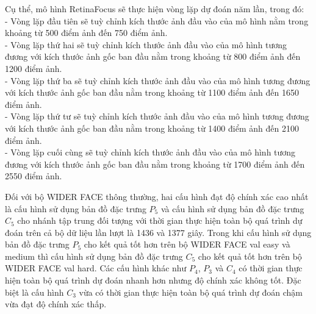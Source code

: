 {    \noindent
    Cụ thể, mô hình RetinaFocus sẽ thực hiện vòng lặp dự đoán năm lần, trong đó: \\
    - Vòng lặp đầu tiên sẽ tuỳ chỉnh kích thước ảnh đầu vào của mô hình nằm trong khoảng từ 500 điểm ảnh đến 750 điểm ảnh. \\
    - Vòng lặp thứ hai sẽ tuỳ chỉnh kích thước ảnh đầu vào của mô hình tương đương với kích thước ảnh gốc ban đầu nằm trong khoảng từ 800 điểm ảnh đến 1200 điểm ảnh. \\
    - Vòng lặp thứ ba sẽ tuỳ chỉnh kích thước ảnh đầu vào của mô hình tương đương với kích thước ảnh gốc ban đầu nằm trong khoảng từ 1100 điểm ảnh đến 1650 điểm ảnh. \\
    - Vòng lặp thứ tư sẽ tuỳ chỉnh kích thước ảnh đầu vào của mô hình tương đương với kích thước ảnh gốc ban đầu nằm trong khoảng từ 1400 điểm ảnh đến 2100 điểm ảnh. \\
    - Vòng lặp cuối cùng sẽ tuỳ chỉnh kích thước ảnh đầu vào của mô hình tương đương với kích thước ảnh gốc ban đầu nằm trong khoảng từ 1700 điểm ảnh đến 2550 điểm ảnh.

    \noindent
    Đối với bộ WIDER FACE thông thường, hai cấu hình đạt độ chính xác cao nhất là cấu hình sử dụng bản đồ đặc trưng ${P}_{5}$ và cấu hình sử dụng bản đồ đặc trưng ${C}_{5}$ cho nhánh tập trung đối tượng với thời gian thực hiện toàn bộ quá trình dự đoán trên cả bộ dữ liệu lần lượt là 1436 và 1377 giây.
    Trong khi cấu hình sử dụng bản đồ đặc trưng ${P}_{5}$ cho kết quả tốt hơn trên bộ WIDER FACE val easy và medium thì cấu hình sử dụng bản đồ đặc trưng ${C}_{5}$ cho kết quả tốt hơn trên bộ WIDER FACE val hard.
    Các cấu hình khác như ${P}_{4}$, ${P}_{3}$ và ${C}_{4}$ có thời gian thực hiện toàn bộ quá trình dự đoán nhanh hơn nhưng độ chính xác không tốt.
    Đặc biệt là cấu hình ${C}_{3}$ vừa có thời gian thực hiện toàn bộ quá trình dự đoán chậm vừa đạt độ chính xác thấp.

}

